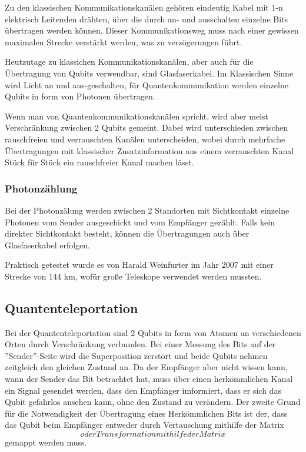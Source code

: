 Zu den klassischen Kommunikationskanälen gehören eindeutig Kabel mit 1-n elektrisch Leitenden drähten, über die durch an- und ausschalten einzelne Bits übertragen werden können. Dieser Kommunikationsweg muss nach einer gewissen maximalen Strecke verstärkt werden, was zu verzögerungen führt.

Heutzutage zu klassichen Kommunikationskanälen, aber auch für die Übertragung von Qubits verwendbar, sind Glasfaserkabel. Im Klassischen Sinne wird Licht an und aus-geschalten, für Quantenkommunikation werden einzelne Qubits in form von Photonen übertragen.

Wenn man von Quantenkommunikationskanälen spricht, wird aber meist Verschränkung zwischen 2 Qubits gemeint. Dabei wird unterschieden zwischen rauschfreien und verrauschten Kanälen unterscheiden, wobei durch mehrfache Übertragungen mit klassischer Zusatzinformation aus einem verrauschten Kanal Stück für Stück ein rauschfreier Kanal machen lässt.


\subsubsection{Photonzählung}
\label{sec:Photonzaelung}

Bei der Photonzälung werden zwischen 2 Standorten mit Sichtkontakt einzelne Photonen vom Sender ausgeschickt und vom Empfänger gezählt. Falls kein direkter Sichtkontakt besteht, können die Übertragungen auch über Glasfaserkabel erfolgen.

Praktisch getestet wurde es von Harald Weinfurter im Jahr 2007 mit einer Strecke von 144 km, wofür große Teleskope verwendet werden mussten.


\subsection{Quantenteleportation}
\label{sec:Quantenteleportation}

Bei der Quantenteleportation sind 2 Qubits in form von Atomen an verschiedenen Orten durch Verschränkung verbunden. Bei einer Messung des Bits auf der ''Sender''-Seite wird die Superposition zerstört und beide Qubits nehmen zeitgleich den gleichen Zustand an. Da der Empfänger aber nicht wissen kann, wann der Sender das Bit betrachtet hat, muss über einen herkömmlichen Kanal ein Signal gesendet werden, dass den Empfänger imformiert, dass er sich das Qubit gefahrlos ansehen kann, ohne den Zustand zu verändern. Der zweite Grund für die Notwendigkeit der Übertragung eines Herkömmlichen Bits ist der, dass das Qubit beim Empfänger entweder durch Vertauschung mithilfe der Matrix $$ oder Transformation mithilfe der Matrix $$ gemappt werden muss.

